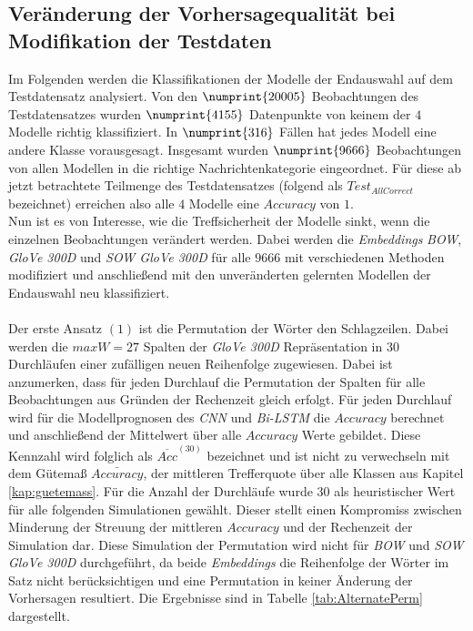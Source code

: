 \documentclass[a4paper,11pt]{article}
\begin{document}
\subsection{Veränderung der Vorhersagequalität bei Modifikation der Testdaten}\label{kap:alternate}

Im Folgenden werden die Klassifikationen der Modelle der Endauswahl auf dem Testdatensatz analysiert.
Von den $\numprint{20005}$ Beobachtungen des Testdatensatzes wurden $\numprint{4155}$ Datenpunkte von keinem der $4$ Modelle richtig klassifiziert.
In $\numprint{316}$ Fällen hat jedes Modell eine andere Klasse vorausgesagt. Insgesamt wurden $\numprint{9666}$ Beobachtungen von allen Modellen in die richtige Nachrichtenkategorie eingeordnet. Für diese ab jetzt betrachtete Teilmenge des Testdatensatzes (folgend als $Test_{AllCorrect}$ bezeichnet) erreichen also alle $4$ Modelle eine $Accuracy$ von $1$. \\
Nun ist es von Interesse, wie die Treffsicherheit der Modelle sinkt, wenn die einzelnen Beobachtungen verändert werden. Dabei werden die \textit{Embeddings} \textit{BOW}, \textit{GloVe 300D} und \textit{SOW GloVe 300D} für alle $9666$ mit verschiedenen Methoden modifiziert und anschließend mit den unveränderten gelernten Modellen der Endauswahl neu klassifiziert.\\
\\
Der erste Ansatz $(1)$ ist die Permutation der Wörter den Schlagzeilen. Dabei werden die $maxW = 27$ Spalten der \textit{GloVe 300D} Repräsentation in $30$ Durchläufen einer zufälligen neuen Reihenfolge zugewiesen. Dabei ist anzumerken, dass für jeden Durchlauf die Permutation der Spalten für alle Beobachtungen aus Gründen der Rechenzeit gleich erfolgt. Für jeden Durchlauf wird für die Modellprognosen des \textit{CNN} und \textit{Bi-LSTM} die $Accuracy$ berechnet und anschließend der Mittelwert über alle $Accuracy$ Werte gebildet. 
Diese Kennzahl wird folglich als $\overline{Acc}^{(30)}$ bezeichnet und ist nicht zu verwechseln mit dem Gütemaß $\bar{Accuracy}$, der mittleren Trefferquote über alle Klassen aus Kapitel \ref{kap:guetemass}.
Für die Anzahl der Durchläufe wurde $30$ als heuristischer Wert für alle folgenden Simulationen gewählt. Dieser stellt einen Kompromiss zwischen Minderung der Streuung der mittleren $Accuracy$ und der Rechenzeit der Simulation dar. Diese Simulation der Permutation wird nicht für \textit{BOW} und \textit{SOW GloVe 300D} durchgeführt, da beide \textit{Embeddings} die Reihenfolge der Wörter im Satz nicht berücksichtigen und eine Permutation in keiner Änderung der Vorhersagen resultiert. Die Ergebnisse sind in Tabelle \ref{tab:AlternatePerm} dargestellt.
\end{document}
